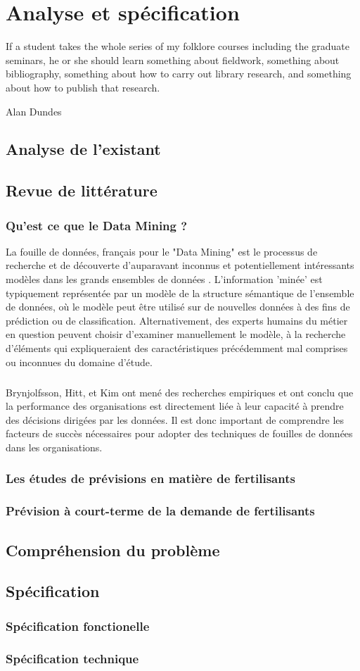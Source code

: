 \chapter{Analyse et spécification}
\epigraph{If a student takes the whole series of my folklore courses including the graduate seminars, he or she should learn something about fieldwork, something about bibliography, something about how to carry out library research, and something about how to publish that research.}{Alan Dundes}

\cleardoublepage

\section{Analyse de l’existant}
\section{Revue de littérature}
\subsection{Qu'est ce que le Data Mining ?}
La fouille de données, français pour le "Data Mining" est le processus de recherche et de découverte d'auparavant inconnus et potentiellement intéressants modèles dans les grands ensembles de données \cite{def-DM}. L'information 'minée' est typiquement représentée par un modèle de la structure sémantique de l'ensemble de données, où le modèle peut être utilisé sur de nouvelles données à des fins de prédiction ou de classification. Alternativement, des experts humains du métier en question peuvent choisir d'examiner manuellement le modèle, à la recherche d'éléments qui expliqueraient des caractéristiques précédemment mal comprises ou inconnues du domaine d'étude.
\paragraph{}
Brynjolfsson, Hitt, et Kim\cite{data-driven-des} ont mené des recherches empiriques et ont conclu que la performance des organisations est directement liée à leur capacité à prendre des décisions dirigées par les données. Il est donc important de comprendre les facteurs de succès nécessaires pour adopter des techniques de fouilles de données dans les organisations.
\subsection{Les études de prévisions en matière de fertilisants}
\subsection{Prévision à court-terme de la demande de fertilisants}
\section{Compréhension du problème}
\section{Spécification}
	\subsection{Spécification fonctionelle}
	\subsection{Spécification technique}